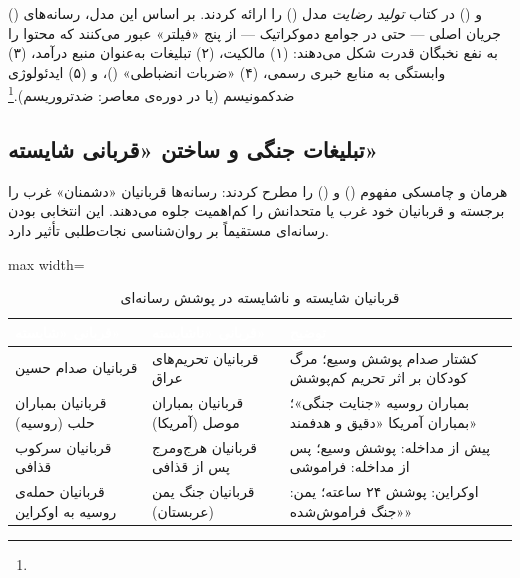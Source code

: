  () و  () در کتاب \textit{تولید رضایت} مدل  () را ارائه کردند. بر اساس این مدل، رسانه‌های جریان اصلی — حتی در جوامع دموکراتیک — از پنج «فیلتر» عبور می‌کنند که محتوا را به نفع نخبگان قدرت شکل می‌دهند: (۱) مالکیت، (۲) تبلیغات به‌عنوان منبع درآمد، (۳) وابستگی به منابع خبری رسمی، (۴) «ضربات انضباطی» ()، و (۵) ایدئولوژی ضدکمونیسم (یا در دوره‌ی معاصر: ضدتروریسم).\footnote{}

\subsection{تبلیغات جنگی و ساختن «قربانی شایسته»}
\label{subsec:ch11-worthy-victims}

هرمان و چامسکی مفهوم  () و  () را مطرح کردند: رسانه‌ها قربانیان «دشمنان» غرب را برجسته و قربانیان خود غرب یا متحدانش را کم‌اهمیت جلوه می‌دهند. این انتخابی بودن رسانه‌ای مستقیماً بر روان‌شناسی نجات‌طلبی تأثیر دارد.

\begin{table}[htbp]
\centering
\caption{قربانیان شایسته و ناشایسته در پوشش رسانه‌ای}
\label{tab:ch11-worthy-victims}
\begin{adjustbox}{max width=\linewidth}
\begin{tabularx}{\linewidth}{
    >{\raggedleft\arraybackslash}p{3cm}
    >{\raggedleft\arraybackslash}p{3cm}
    >{\raggedleft\arraybackslash}X
}
\toprule
\rowcolor{PrimaryDeep}
\textcolor{white}{\textbf{قربانی «شایسته»}} &
\textcolor{white}{\textbf{قربانی «ناشایسته»}} &
\textcolor{white}{\textbf{توضیح}} \\
\midrule
قربانیان صدام حسین & قربانیان تحریم‌های عراق & کشتار صدام پوشش وسیع؛ مرگ کودکان بر اثر تحریم کم‌پوشش \\
\rowcolor{NeutralLight}
قربانیان بمباران حلب (روسیه) & قربانیان بمباران موصل (آمریکا) & بمباران روسیه «جنایت جنگی»؛ بمباران آمریکا «دقیق و هدفمند» \\
قربانیان سرکوب قذافی & قربانیان هرج‌ومرج پس از قذافی & پیش از مداخله: پوشش وسیع؛ پس از مداخله: فراموشی \\
\rowcolor{NeutralLight}
قربانیان حمله‌ی روسیه به اوکراین & قربانیان جنگ یمن (عربستان) & اوکراین: پوشش ۲۴ ساعته؛ یمن: «جنگ فراموش‌شده» \\
\bottomrule
\end{tabularx}
\end{adjustbox}
\end{table}

